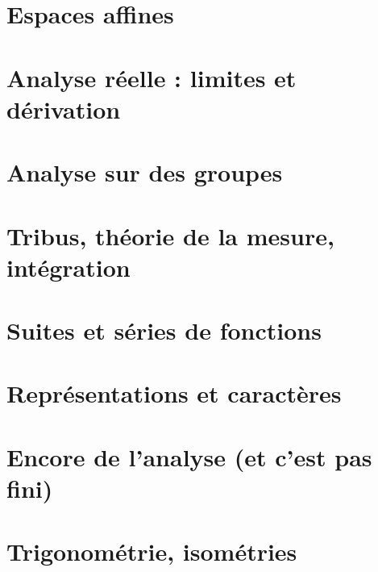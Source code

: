 \documentclass[a4paper,twoside,11pt]{book}
\begin{document}
\chapter{Espaces affines}



\chapter{Analyse réelle : limites et dérivation}











\chapter{Analyse sur des groupes}


\chapter{Tribus, théorie de la mesure, intégration}







\chapter{Suites et séries de fonctions}





\chapter{Représentations et caractères}


\chapter{Encore de l'analyse (et c'est pas fini)}






\chapter{Trigonométrie, isométries}








\end{document}
